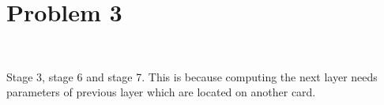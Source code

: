 \section{Problem 3}~\label{sec:prob3}

Stage 3, stage 6 and stage 7.
This is because computing the next layer needs
parameters of previous layer which are located
on another card.
